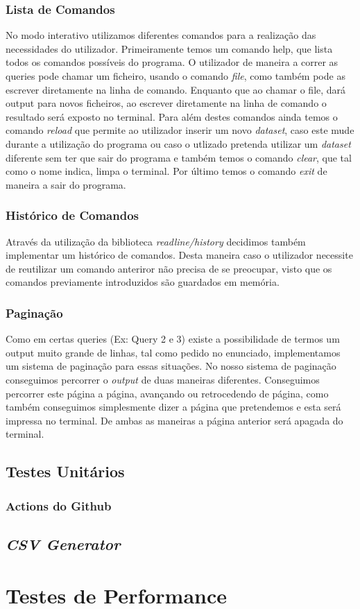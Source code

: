 \documentclass{article}
\begin{document}
        \subsubsection{Lista de Comandos}
            No modo interativo utilizamos diferentes comandos para a realização das necessidades do utilizador.
            Primeiramente temos um comando help, que lista todos os comandos possíveis do programa. O utilizador de maneira a correr as queries pode chamar um ficheiro, usando o comando \emph{file}, como também pode as escrever diretamente na linha de comando. Enquanto que ao chamar o file, dará output para novos ficheiros, ao escrever diretamente na linha de comando o resultado será exposto no terminal.
            Para além destes comandos ainda temos o comando \emph{reload} que permite ao utilizador inserir um novo \emph{dataset}, caso este mude durante a utilização do programa ou caso o utlizado pretenda utilizar um \emph{dataset} diferente sem ter que sair do programa e também temos o comando \emph{clear}, que tal como o nome indica, limpa o terminal. Por último temos o comando \emph{exit} de maneira a sair do programa.
        \subsubsection{Histórico de Comandos}
            Através da utilização da biblioteca \emph{readline/history} decidimos também implementar um histórico de comandos. Desta maneira caso o utilizador necessite de reutilizar um comando anteriror
            não precisa de se preocupar, visto que os comandos previamente introduzidos são guardados em memória.
        \subsubsection{Paginação}
            Como em certas queries (Ex: Query 2 e 3) existe a possibilidade de termos um output muito grande de linhas, tal como pedido no enunciado, implementamos um sistema de paginação para essas situações.
            No nosso sistema de paginação conseguimos percorrer o \emph{output} de duas maneiras diferentes. Conseguimos percorrer este página a página, avançando ou retrocedendo de página, como também conseguimos simplesmente dizer a página que pretendemos e esta será impressa no terminal. De ambas as maneiras a página anterior será apagada do terminal.
    \subsection{Testes Unitários}
        \subsubsection{Actions do Github}
    \subsection{\emph{CSV Generator}}
    \section{Testes de Performance}

        


    
\end{document}

